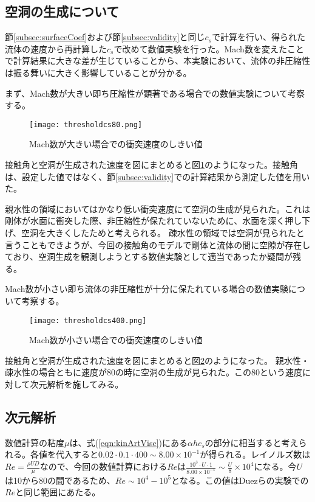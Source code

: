 \documentclass[]{jsarticle}
\begin{document}
\subsection{空洞の生成について}
\label{subsec:discCavityForm}
節\ref{subsec:surfaceCoef}および節\ref{subsec:validity}と同じ$c_s$で計算を行い、得られた流体の速度から再計算した$c_s$で改めて数値実験を行った。Mach数を変えたことで計算結果に大きな差が生じていることから、本実験において、流体の非圧縮性は振る舞いに大きく影響していることが分かる。

まず、Mach数が大きい即ち圧縮性が顕著である場合での数値実験について考察する。
\begin{figure}[H]
  \centering
  \texttt{[image: thresholdcs80.png]}
  \caption{Mach数が大きい場合での衝突速度のしきい値
    \label{fig:threscs80} }
\end{figure}

接触角と空洞が生成された速度を図にまとめると図\ref{fig:threscs80}のようになった。接触角は、設定した値ではなく、節\ref{subsec:validity}での計算結果から測定した値を用いた。

親水性の領域においてはかなり低い衝突速度にて空洞の生成が見られた。これは剛体が水面に衝突した際、非圧縮性が保たれていないために、水面を深く押し下げ、空洞を大きくしたためと考えられる。
疎水性の領域では空洞が見られたと言うこともできようが、今回の接触角のモデルで剛体と流体の間に空隙が存在しており、空洞生成を観測しようとする数値実験として適当であったか疑問が残る。

Mach数が小さい即ち流体の非圧縮性が十分に保たれている場合の数値実験について考察する。
\begin{figure}[H]
  \centering
  \texttt{[image: thresholdcs400.png]}
  \caption{Mach数が小さい場合での衝突速度のしきい値
    \label{fig:threscs400} }
\end{figure}

接触角と空洞が生成された速度を図にまとめると図\ref{fig:threscs400}のようになった。
親水性・疎水性の場合ともに速度が80の時に空洞の生成が見られた。この80という速度に対して次元解析を施してみる。
\subsection{次元解析}
\label{subsec:label}
数値計算の粘度$\mu$は、式(\ref{eqn:kinArtVisc})にある$\alpha h c_s$の部分に相当すると考えられる。各値を代入すると$0.02\cdot 0.1 \cdot 400 \sim 8.00\times 10^{-1}$が得られる。レイノルズ数は$Re=\frac{\rho U D}{\mu}$なので、今回の数値計算における$Re$は$\frac{10^3\cdot U \cdot 1}{8.00\times10^{-1}}\sim \frac{U}{8}\times10^4$になる。今$U$は10から80の間であるため、$Re\sim 10^4-10^5$となる。この値はDuezらの実験での$Re$と同じ範囲にあたる。
\end{document}

